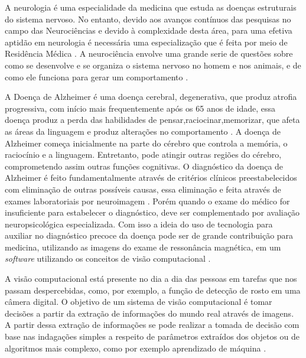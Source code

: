 \documentclass[openright]{UFRGS} %
\begin{document}
A neurologia é uma especialidade da medicina que estuda as doenças
estruturais do sistema nervoso. No entanto, devido aos avanços contínuos das
pesquisas no campo das Neurociências e devido à complexidade desta área, para uma efetiva aptidão em neurologia é necessária uma especialização que é feita por meio de Residência Médica \cite{reed2013neurologia}. A neurociência  envolve uma grande serie de questões sobre como se desenvolve e se organiza o sistema nervoso no homem e nos animais, e de como ele funciona para gerar um comportamento  \cite{purves2008neuroscience}.


A Doença de Alzheimer é uma doença cerebral, degenerativa, que produz atrofia progressiva, com início mais frequentemente após os 65 anos de idade, essa doença produz a perda das habilidades de pensar,raciocinar,memorizar, que afeta as áreas da linguagem e produz alterações no comportamento \cite{alzheimer2003funccoes}. A doença de Alzheimer começa inicialmente na parte do cérebro que controla a memória, o raciocínio e a linguagem. Entretanto, pode atingir outras regiões do cérebro, comprometendo assim outras funções cognitivas. O diagnóstico da doença de Alzheimer é feito fundamentalmente através de critérios clínicos preestabelecidos com eliminação de outras possíveis causas, essa eliminação e feita através de exames
laboratoriais por neuroimagem \cite{nitrini2005diagnostico}. Porém quando o exame do médico for insuficiente para estabelecer o diagnóstico,
deve ser complementado por avaliação neuropsicológica
especializada. Com isso a ideia do uso de tecnologia para auxiliar no diagnóstico precoce da doença pode  ser de grande contribuição para medicina, utilizando as imagens do exame de ressonância magnética, em um
\textit{software} utilizando os conceitos de visão computacional \cite{aprahamian2009doencca}.

A visão computacional está presente no dia a dia das pessoas em tarefas que nos passam despercebidas, como, por exemplo, a função de detecção de rosto em uma câmera digital. O objetivo de um sistema de visão computacional é tomar decisões a partir da extração de informações do mundo real através de imagens. A partir dessa extração de informações se pode realizar a tomada de decisão com base nas indagações simples a respeito de parâmetros extraídos dos objetos ou de algoritmos mais complexo, como por exemplo  aprendizado de máquina \cite{neves2012avanccos}.
\end{document}
